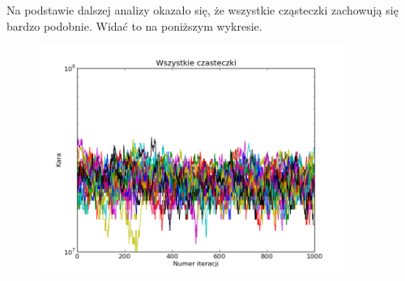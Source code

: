 \par Na podstawie dalszej analizy okazało się, że wszystkie cząsteczki zachowują się bardzo podobnie. Widać to na poniższym wykresie.
\begin{figure}[H]
\includegraphics[width=10cm]{img/standard_particle_all.png}
\centering
\end{figure}
